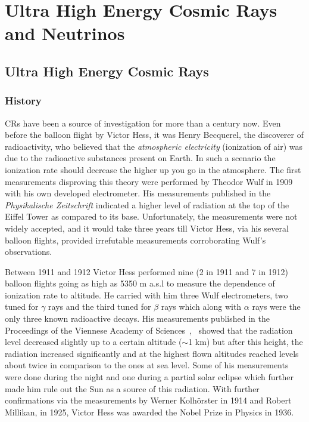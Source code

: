 
\chapter{Ultra High Energy Cosmic Rays and Neutrinos}
\label{chap:crnNu}

\section{Ultra High Energy Cosmic Rays}
\label{sec:UHECR}
\subsection{History}
\label{subsec:crhist}
\glspl{CR} have been a source of investigation for more than a century now. Even before the balloon flight by Victor Hess, it was Henry Becquerel, the discoverer of radioactivity, who believed that the \textit{atmospheric electricity} (ionization of air) was due to the radioactive substances present on Earth. In such a scenario the ionization rate should decrease the higher up you go in the atmosphere. The first measurements disproving this theory were performed by Theodor Wulf in 1909 with his own developed electrometer. His measurements published in the \textit{Physikalische Zeitschrift} indicated a higher level of radiation at the top of the Eiffel Tower as compared to its base. Unfortunately, the measurements were not widely accepted, and it would take three years till Victor Hess, via his several balloon flights, provided irrefutable measurements corroborating Wulf's observations.

Between 1911 and 1912 Victor Hess performed nine (2 in 1911 and 7 in 1912) balloon flights going as high as 5350 m a.s.l to measure the dependence of ionization rate to altitude. He carried with him three Wulf electrometers, two tuned for $\gamma$ rays and the third tuned for $\beta$ rays which along with $\alpha$ rays were the only three known radioactive decays. His measurements published in the Proceedings of the Viennese Academy of Sciences~\cite{Hess:1912srp},~\cite{hess2018observationspenetratingradiationseven} showed that the radiation level decreased slightly up to a certain altitude ($\sim$1 km) but after this height, the radiation increased significantly and at the highest flown altitudes reached levels about twice in comparison to the ones at sea level. Some of his measurements were done during the night and one during a partial solar eclipse which further made him rule out the Sun as a source of this radiation. With further confirmations via the measurements by Werner Kolhörster in 1914 and Robert Millikan, in 1925, Victor Hess was awarded the Nobel Prize in Physics in 1936. 

